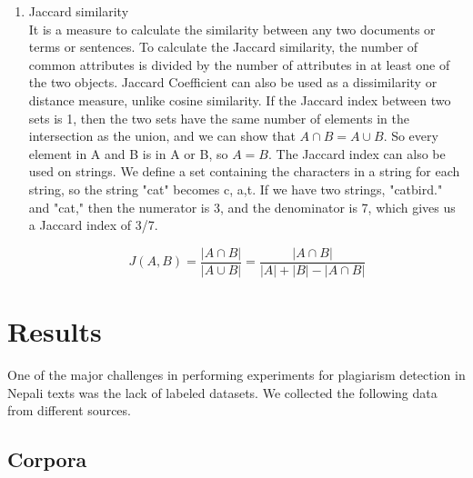 \documentclass[conference]{IEEEtran}
\begin{document}
\begin{enumerate}
\medskip

\item Jaccard similarity\\
It is a measure to calculate the similarity between any two documents or terms
or sentences. To calculate the Jaccard similarity, the number of common
attributes is divided by the number of attributes in at least one of
the two objects. Jaccard Coefficient can also be used as a dissimilarity or
distance measure, unlike cosine similarity. If the Jaccard index between two
sets is 1, then the two sets have the same number of elements in the
intersection as the union, and we can show that ${A \cap B=A \cup B}$. So every
element in A and B is in A or B, so ${A = B}$. The Jaccard index can also be
used on strings. We define a set containing the characters in a
string for each string, so the string "cat" becomes {c, a,t}. If we have two strings, "catbird."
and "cat," then the numerator is 3, and the denominator is 7, which gives us a
Jaccard index of 3/7.

\begin{equation}
J(A,B) = \frac{|A\cap B|}{|A\cup B|}=\frac{|A\cap B|}{|A| + |B| -|A\cap B|}\label{eq6}
\end{equation}
\end{enumerate}
\medskip

\section{Results}

One of the major challenges in performing experiments for plagiarism detection
in Nepali texts was the lack of labeled datasets. We collected the following data
from different sources.

\subsection{Corpora}
\end{document}
